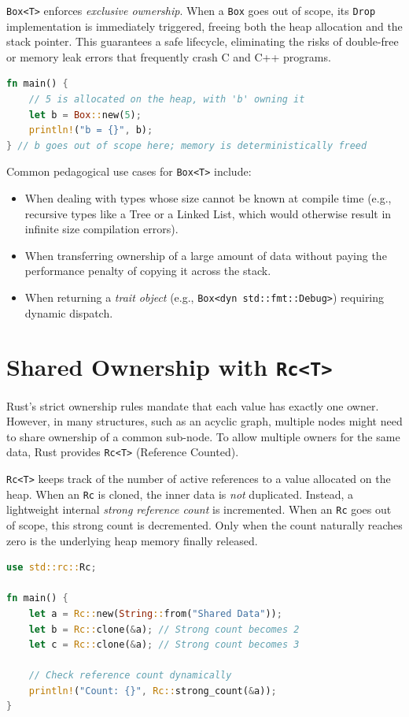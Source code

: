 \texttt{Box<T>} enforces \textit{exclusive ownership}. When a \texttt{Box} goes out of scope, its \texttt{Drop} implementation is immediately triggered, freeing both the heap allocation and the stack pointer. This guarantees a safe lifecycle, eliminating the risks of double-free or memory leak errors that frequently crash C and C++ programs.

\begin{lstlisting}[language=Rust]
fn main() {
    // 5 is allocated on the heap, with 'b' owning it
    let b = Box::new(5); 
    println!("b = {}", b);
} // b goes out of scope here; memory is deterministically freed
\end{lstlisting}

Common pedagogical use cases for \texttt{Box<T>} include:
\begin{itemize}
    \item When dealing with types whose size cannot be known at compile time (e.g., recursive types like a Tree or a Linked List, which would otherwise result in infinite size compilation errors).
    \item When transferring ownership of a large amount of data without paying the performance penalty of copying it across the stack.
    \item When returning a \textit{trait object} (e.g., \texttt{Box<dyn std::fmt::Debug>}) requiring dynamic dispatch.
\end{itemize}

\section{Shared Ownership with \texttt{Rc<T>}}
Rust's strict ownership rules mandate that each value has exactly one owner. However, in many structures, such as an acyclic graph, multiple nodes might need to share ownership of a common sub-node. To allow multiple owners for the same data, Rust provides \texttt{Rc<T>} (Reference Counted).

\texttt{Rc<T>} keeps track of the number of active references to a value allocated on the heap. When an \texttt{Rc} is cloned, the inner data is \textit{not} duplicated. Instead, a lightweight internal \textit{strong reference count} is incremented. When an \texttt{Rc} goes out of scope, this strong count is decremented. Only when the count naturally reaches zero is the underlying heap memory finally released.

\begin{lstlisting}[language=Rust]
use std::rc::Rc;

fn main() {
    let a = Rc::new(String::from("Shared Data"));
    let b = Rc::clone(&a); // Strong count becomes 2
    let c = Rc::clone(&a); // Strong count becomes 3
    
    // Check reference count dynamically
    println!("Count: {}", Rc::strong_count(&a)); 
}
\end{lstlisting}


